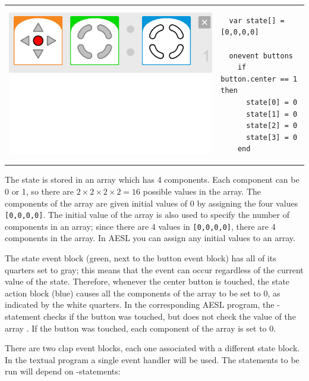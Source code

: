 \documentclass[11pt,a4paper,english]{report}
\begin{document}
\begin{center}
\begin{tabular}{ll}
\includegraphics[width=.4\textwidth]{two-button} &
\begin{minipage}[b]{.5\textwidth}
\begin{footnotesize}
\begin{verbatim}
  var state[] = [0,0,0,0]
  
  onevent buttons
    if button.center == 1 then
      state[0] = 0
      state[1] = 0
      state[2] = 0
      state[3] = 0
    end
\end{verbatim}
\end{footnotesize}
\end{minipage}
\end{tabular}
\end{center}

The state is stored in an array  which has 4 components. Each
component can be 0 or 1, so there are $2\times 2\times 2\times 2=16$
possible values in the array. The components of the array are given
initial values of 0 by assigning the four values \verb+[0,0,0,0]+. The
initial value of the array is also used to specify the number of
components in an array; since there are 4 values in \verb+[0,0,0,0]+,
there are 4 components in the array. In AESL you can assign any initial
values to an array.

The state event block (green, next to the button event block) has all of
its quarters set to gray; this means that the event can occur regardless
of the current value of the state. Therefore, whenever the center button
is touched, the state action block (blue) causes all the components of
the array  to be set to 0, as indicated by the white quarters.
In the corresponding AESL program, the -statement checks if the
button was touched, but does not check the value of the array .
If the button was touched, each component of the array is set to 0.

There are two clap event blocks, each one associated with a different
state block. In the textual program a single  event handler will
be used. The statements to be run will depend on -statements:
\end{document}
